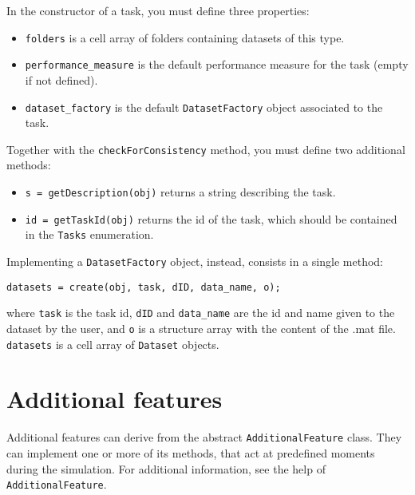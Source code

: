 In the constructor of a task, you must define three properties:

\begin{itemize}
\item \verb|folders| is a cell array of folders containing datasets of this type.
\item \verb|performance_measure| is the default performance measure for the task (empty if not defined).
\item \verb|dataset_factory| is the default \verb|DatasetFactory| object associated to the task.
\end{itemize}

\noindent Together with the \verb|checkForConsistency| method, you must define two additional methods:

\begin{itemize}
\item \verb|s = getDescription(obj)| returns a string describing the task.
\item \verb|id = getTaskId(obj)| returns the id of the task, which should be contained in the \verb|Tasks| enumeration.
\end{itemize}

\noindent Implementing a \verb|DatasetFactory| object, instead, consists in a single method:

\begin{lstlisting}
datasets = create(obj, task, dID, data_name, o);
\end{lstlisting}

\noindent where \verb|task| is the task id, \verb|dID| and \verb|data_name| are the id and name given to the dataset by the user, and \verb|o| is a structure array with the content of the .mat file. \verb|datasets| is a cell array of \verb|Dataset| objects.

\section{Additional features}

Additional features can derive from the abstract \verb|AdditionalFeature| class. They can implement one or more of its methods, that act at predefined moments during the simulation. For additional information, see the help of \verb|AdditionalFeature|.